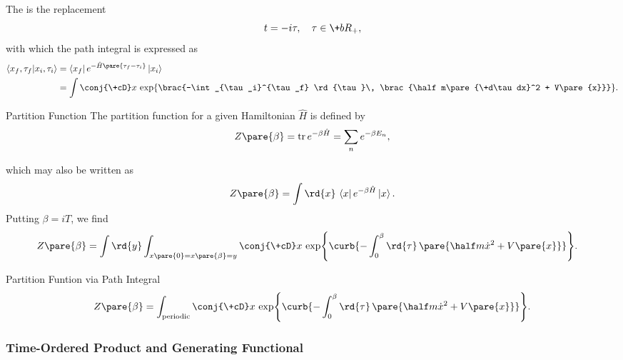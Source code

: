 \documentclass[hidelinks]{article}
\begin{document}
The  is the replacement
\[ t = -i\tau,\quad \tau\in\+bR_+, \]
with which the path integral is expressed as
\begin{align*}
    \bra{x_f,\tau_f}\ket{x_i,\tau_i} &= \bra{x_f}e^{-\hat H\pare{\tau_f - \tau_i}}\ket{x_i} \\
    &= \int \conj{\+cD}x\,\exp\brac{-\int_{\tau_i}^{\tau_f} \rd{\tau}\, \brac{\half m\pare{\+d\tau dx}^2 + V\pare{x}}}.
\end{align*}
\begin{termdef}{Partition Function}
    The {partition function} for a given Hamiltonian $\hat H$ is defined by
    \[ Z\pare{\beta} = \trace e^{-\beta \hat H} = \sum_n e^{-\beta E_n}, \]
\end{termdef}
which may also be written as
\[ Z\pare{\beta} = \int \rd{x}\,\bra{x}e^{-\beta\hat H}\ket{x}. \]
Putting $\beta = iT$, we find
\begin{align}
    Z\pare{\beta} &= \int \rd{y}\int_{x\pare{0} = x\pare{\beta} = y}\conj{\+cD}x\,\exp\curb{-\int_0^\beta \rd{\tau}\,\pare{\half m\dot{x}^2 + V\pare{x}}}. \notag
\end{align}\vspace{-\baselineskip}
\begin{finaleq}{Partition Funtion via Path Integral}
    \begin{equation}
    \label{eq:partition_function_by_path_integral}
        Z\pare{\beta} = \int_{\mathrm{periodic}}\conj{\+cD}x\,\exp\curb{-\int_0^\beta \rd{\tau}\,\pare{\half m\dot{x}^2 + V\pare{x}}}.
    \end{equation}
\end{finaleq}


\subsubsection{Time-Ordered Product and Generating Functional} %
\label{ssub:time_ordered_product_and_generating_functional}
\end{document}
